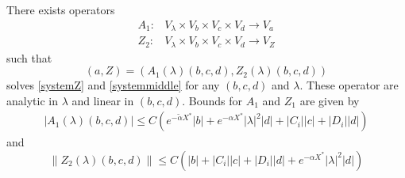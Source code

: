 \documentclass[thesis.tex]{subfiles}
\begin{document}
\begin{lemma}\label{Zinv1}
There exists operators
\begin{align*}
A_1: &V_\lambda \times V_b \times V_c \times V_d \rightarrow V_a \\
Z_2: &V_\lambda \times V_b \times V_c \times V_d \rightarrow V_Z
\end{align*}
such that 
\[
(a, Z) = (A_1(\lambda)(b, c, d), Z_2(\lambda)(b,c,d))
\]
solves \eqref{systemZ} and \eqref{systemmiddle} for any $(b, c, d)$ and $\lambda$. These operator are analytic in $\lambda$ and linear in $(b, c, d)$. Bounds for $A_1$ and $Z_1$ are given by
\begin{align}\label{A1bound}
|A_1(\lambda)(b, c, d)| \leq C \left( e^{-\tilde{\alpha} X^*} |b|  + e^{-\alpha X^*}|\lambda|^2 |d| + |C_i||c| + |D_i||d| \right)
\end{align} 
and
\begin{equation}\label{Z2bound}
\| Z_2(\lambda)(b,c,d) \| \leq C\left(|b| + |C_i||c| + |D_i||d| + e^{-\alpha X^*}|\lambda|^2|d|\right)
\end{equation}


\end{lemma}
\end{document}
